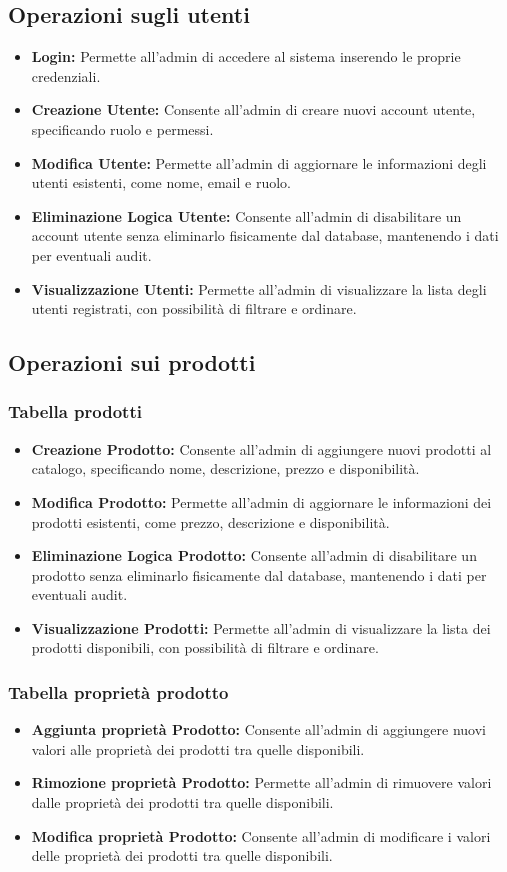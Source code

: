 \documentclass[12pt, a4paper]{article}
\begin{document}
\subsection{Operazioni sugli utenti}
\begin{itemize}
    \item \textbf{Login:} Permette all'admin di accedere al sistema inserendo le proprie credenziali.
    \item \textbf{Creazione Utente:} Consente all'admin di creare nuovi account utente, specificando ruolo e permessi.
    \item \textbf{Modifica Utente:} Permette all'admin di aggiornare le informazioni degli utenti esistenti, come nome, email e ruolo.
    \item \textbf{Eliminazione Logica Utente:} Consente all'admin di disabilitare un account utente senza eliminarlo fisicamente dal database, mantenendo i dati per eventuali audit.
    \item \textbf{Visualizzazione Utenti:} Permette all'admin di visualizzare la lista degli utenti registrati, con possibilità di filtrare e ordinare.
\end{itemize}
\subsection{Operazioni sui prodotti}
\subsubsection{Tabella prodotti}
\begin{itemize}
    \item \textbf{Creazione Prodotto:} Consente all'admin di aggiungere nuovi prodotti al catalogo, specificando nome, descrizione, prezzo e disponibilità.
    \item \textbf{Modifica Prodotto:} Permette all'admin di aggiornare le informazioni dei prodotti esistenti, come prezzo, descrizione e disponibilità.
    \item \textbf{Eliminazione Logica Prodotto:} Consente all'admin di disabilitare un prodotto senza eliminarlo fisicamente dal database, mantenendo i dati per eventuali audit.
    \item \textbf{Visualizzazione Prodotti:} Permette all'admin di visualizzare la lista dei prodotti disponibili, con possibilità di filtrare e ordinare.
\end{itemize}
\subsubsection{Tabella proprietà prodotto}
\begin{itemize}
    \item \textbf{Aggiunta proprietà Prodotto:} Consente all'admin di aggiungere nuovi valori alle proprietà dei prodotti tra quelle disponibili.
    \item \textbf{Rimozione proprietà Prodotto:} Permette all'admin di rimuovere valori dalle proprietà dei prodotti tra quelle disponibili.
    \item \textbf{Modifica proprietà Prodotto:} Consente all'admin di modificare i valori delle proprietà dei prodotti tra quelle disponibili.
\end{itemize}
\end{document}
